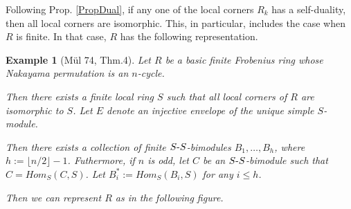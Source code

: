 \documentclass[11pt]{article}
\theoremstyle{plain}
\newtheorem{Ex}[veta]{Example}
\theoremstyle{remark}
\theoremstyle{plain}
\begin{document}
 
Following Prop. \ref{PropDual},  if any one of the local corners $R_k$ has a self-duality, then all local corners are isomorphic. This, in particular, includes the case when $R$ is finite. In that case, $R$ has the following representation.
 \begin{Ex}[Mül 74, Thm.4]\label{ExMueler}
     Let $R$ be a basic finite Frobenius ring whose Nakayama permutation is an $n$-cycle.
     
     Then there exists a finite local ring $S$ such that all local corners of $R$ are isomorphic to $S$. Let $E$ denote an injective envelope of the unique simple $S$-module.
     
     Then there exists a collection of finite $S\text-S$-bimodules $B_1, \dots, B_h$, where $h:=\lfloor n/2\rfloor -1$. Futhermore, if $n$ is odd, let $C$ be an $S\text-S$-bimodule such that $C=Hom_S(C, S)$. Let $B_i^*:=Hom_S(B_i, S)$ for any $i\leq h$. 

     Then we can represent $R$ as in the following figure. \end{Ex}
\end{document}
